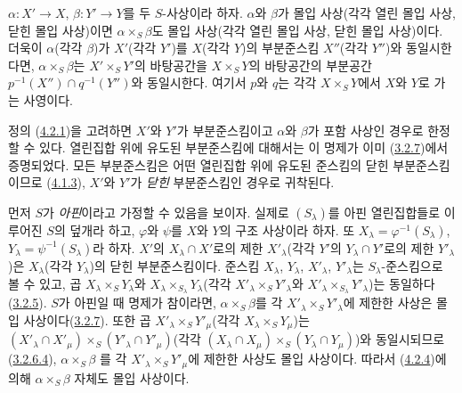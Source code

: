 \begin{proposition}[4.3.1]
\label{I.4.3.1-ko}
$\alpha:X'\to X$, $\beta:Y'\to Y$를 두 $S$-사상이라 하자. $\alpha$와
$\beta$가 몰입 사상(각각 열린 몰입 사상, 닫힌 몰입 사상)이면
$\alpha\times_S\beta$도 몰입 사상(각각 열린 몰입 사상, 닫힌 몰입
사상)이다. 더욱이 $\alpha$(각각 $\beta$)가 $X'$(각각 $Y'$)를
$X$(각각 $Y$)의 부분준스킴 $X''$(각각 $Y''$)와 동일시한다면,
$\alpha\times_S\beta$는 $X'\times_S Y'$의 바탕공간을
$X\times_S Y$의 바탕공간의 부분공간
$p^{-1}(X'')\cap q^{-1}(Y'')$와 동일시한다. 여기서 $p$와 $q$는 각각
$X\times_S Y$에서 $X$와 $Y$로 가는 사영이다.
\end{proposition}

정의 (\hyperref[I.4.2.1-ko]{4.2.1})을 고려하면 $X'$와 $Y'$가
부분준스킴이고 $\alpha$와 $\beta$가 포함 사상인 경우로 한정할 수
있다. 열린집합 위에 유도된 부분준스킴에 대해서는 이 명제가 이미
(\hyperref[I.3.2.7-ko]{3.2.7})에서 증명되었다. 모든 부분준스킴은 어떤
열린집합 위에 유도된 준스킴의 닫힌 부분준스킴이므로
(\hyperref[I.4.1.3-ko]{4.1.3}), $X'$와 $Y'$가 \emph{닫힌}
부분준스킴인 경우로 귀착된다.

먼저 $S$가 \emph{아핀}이라고 가정할 수 있음을 보이자. 실제로
$(S_\lambda)$를 아핀 열린집합들로 이루어진 $S$의 덮개라 하고,
$\varphi$와 $\psi$를 $X$와 $Y$의 구조 사상이라 하자. 또
$X_\lambda=\varphi^{-1}(S_\lambda)$,
$Y_\lambda=\psi^{-1}(S_\lambda)$라 하자. $X'$의
$X_\lambda\cap X'$로의 제한 $X'_\lambda$(각각 $Y'$의
$Y_\lambda\cap Y'$로의 제한 $Y'_\lambda$)은 $X_\lambda$(각각
$Y_\lambda$)의 닫힌 부분준스킴이다. 준스킴 $X_\lambda$,
$Y_\lambda$, $X'_\lambda$, $Y'_\lambda$는 $S_\lambda$-준스킴으로
볼 수 있고, 곱 $X_\lambda\times_S Y_\lambda$와
$X_\lambda\times_{S_\lambda}Y_\lambda$(각각
$X'_\lambda\times_S Y'_\lambda$와
$X'_\lambda\times_{S_\lambda}Y'_\lambda$)는 동일하다
(\hyperref[I.3.2.5-ko]{3.2.5}). $S$가 아핀일 때 명제가 참이라면,
$\alpha\times_S\beta$를 각 $X'_\lambda\times_S Y'_\lambda$에
제한한 사상은 몰입 사상이다(\hyperref[I.3.2.7-ko]{3.2.7}). 또한 곱
$X'_\lambda\times_S Y'_\mu$(각각 $X_\lambda\times_S Y_\mu$)는
$(X'_\lambda\cap X'_\mu)\times_S
(Y'_\lambda\cap Y'_\mu)$(각각
$(X_\lambda\cap X_\mu)\times_S(Y_\lambda\cap Y_\mu)$)와
동일시되므로(\hyperref[I.3.2.6.4-ko]{3.2.6.4}),
$\alpha\times_S\beta$
를 각 $X'_\lambda\times_S Y'_\mu$에 제한한 사상도 몰입 사상이다.
따라서 (\hyperref[I.4.2.4-ko]{4.2.4})에 의해
$\alpha\times_S\beta$ 자체도 몰입 사상이다.

